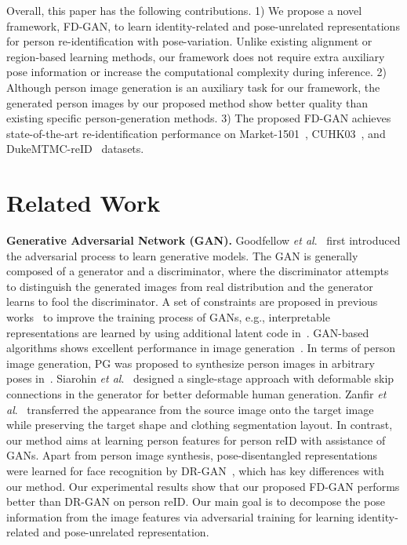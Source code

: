 \documentclass{article}
\newcommand{\etal}{\textit{et al}.}
\begin{document}
Overall, this paper has the following contributions.  
1) We propose a novel framework, FD-GAN, to learn identity-related and pose-unrelated representations for person re-identification with pose-variation.
Unlike existing alignment or region-based learning methods, our framework does not require extra auxiliary pose information or increase the computational complexity during inference. 
2) Although person image generation is an auxiliary task for our framework, the generated person images by our proposed method show better quality than existing specific person-generation methods.
3) The proposed FD-GAN achieves state-of-the-art re-identification performance on Market-1501~\cite{market}, CUHK03~\cite{cuhk}, and DukeMTMC-reID~\cite{duke} datasets.

\section{Related Work}

\textbf{Generative Adversarial Network (GAN).} 
Goodfellow \etal~\cite{goodfellow2014generative} first introduced the adversarial process to learn generative models. 
The GAN is generally composed of a generator and a discriminator, where the discriminator attempts to distinguish the generated images from real distribution and the generator learns to fool the discriminator.
A set of constraints are proposed in previous works~\cite{huang2017stacked,nowozin2016f,radford2015unsupervised,chen2016infogan} to improve the training process of GANs, e.g., interpretable representations are learned by using additional latent code in~\cite{chen2016infogan}.
GAN-based algorithms shows excellent performance in image generation~\cite{Li_2017_CVPR,Bousmalis_2017_CVPR,Kaneko_2017_CVPR,Nguyen_2017_ICCV,Zhang_2017_ICCV}.
In terms of person image generation, PG was proposed to synthesize person images in arbitrary poses in~\cite{ma2017pose}. Siarohin \etal~\cite{siarohin2017deformable} designed a single-stage approach with deformable skip connections in the generator for better deformable human generation. 
Zanfir \etal~\cite{Zanfir_2018_CVPR} transferred the appearance from the source image onto the target image while preserving the target shape and clothing segmentation layout.
In contrast, our method aims at learning person features for person reID with assistance of GANs.
Apart from person image synthesis, pose-disentangled representations were learned for face recognition by DR-GAN~\cite{tran2017disentangled}, which has key differences with our method. Our experimental results show that our proposed FD-GAN performs better than DR-GAN on person reID.
Our main goal is to decompose the pose information from the image features via adversarial training for learning identity-related and pose-unrelated representation.
\end{document}
